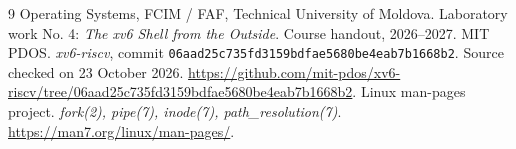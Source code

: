 \begin{thebibliography}{9}
 Operating Systems, FCIM / FAF, Technical University of Moldova.
Laboratory work No. 4: \emph{The xv6 Shell from the Outside}. Course handout, 2026--2027.
 MIT PDOS. \emph{xv6-riscv}, commit
\texttt{06aad25c735fd3159bdfae5680be4eab7b1668b2}.
Source checked on 23 October 2026.
\url{https://github.com/mit-pdos/xv6-riscv/tree/06aad25c735fd3159bdfae5680be4eab7b1668b2}.
 Linux man-pages project. \emph{fork(2), pipe(7), inode(7), path\_resolution(7)}.
\url{https://man7.org/linux/man-pages/}.
\end{thebibliography}
